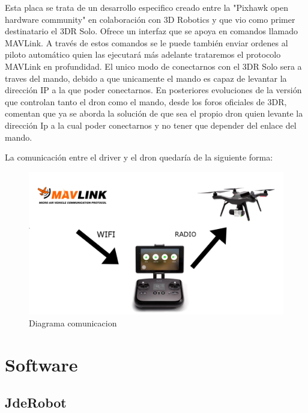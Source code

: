 Esta placa se trata de un desarrollo especifico creado entre la "Pixhawk open hardware community" en colaboración con 3D Robotics y que vio como primer destinatario el 3DR Solo. Ofrece un interfaz que se apoya en comandos llamado MAVLink. A trav\'es de estos comandos se le puede tambi\'en enviar ordenes al piloto autom\'atico quien las ejecutar\'a más adelante trataremos el protocolo MAVLink en profundidad. El unico modo de conectarnos con el 3DR Solo sera a traves del mando, debido a que unicamente el mando es capaz de levantar la dirección IP a la que poder conectarnos. En posteriores evoluciones de la versión que controlan tanto el dron como el mando, desde los foros oficiales de 3DR, comentan que ya se aborda la solución de que sea el propio dron quien levante la dirección Ip a la cual poder conectarnos y no tener que depender del enlace del mando.

La comunicación entre el driver y el dron quedaría de la siguiente forma:

\begin{figure}[H]
  \centering
  \includegraphics[scale=0.15]{imagenes/diagramaComunicacion.jpg}
  \caption{Diagrama comunicacion}
  \label{fig:diagrama}
\end{figure}

\section{Software}
\label{sec:software}

\subsection{JdeRobot}
\label{sec:jderobot}

